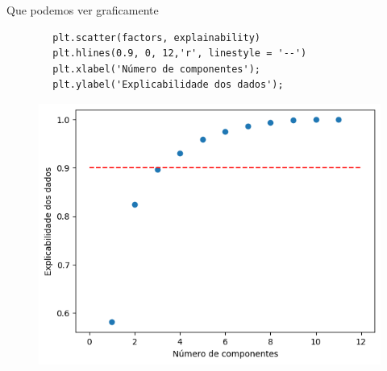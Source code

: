 Que podemos ver graficamente
\begin{longlisting}
    \begin{verbatim}
        plt.scatter(factors, explainability)
        plt.hlines(0.9, 0, 12,'r', linestyle = '--')
        plt.xlabel('Número de componentes');
        plt.ylabel('Explicabilidade dos dados');
    \end{verbatim}
\end{longlisting}
\begin{figure}[H]
    \centering
    \includegraphics[width=0.6\linewidth]{figures/explicability2.png}
\end{figure}

